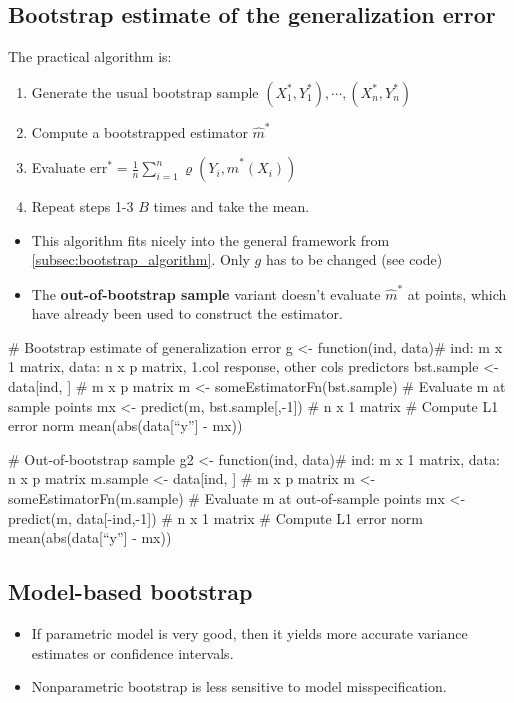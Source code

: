  \subsection{Bootstrap estimate of the generalization error}
 \begin{theory}
  The practical algorithm is:
  \begin{enumerate}
   \item Generate the usual bootstrap sample $(X_1^{\ast}, Y_1^{\ast}), \cdots, (X_n^{\ast}, Y_n^{\ast})$
   \item Compute a bootstrapped estimator $\hat{m}^{\ast}$
   \item Evaluate $\text{err}^{\ast} = \frac{1}{n} \sum_{i=1}^n \varrho(Y_i, \hat{m}^{\ast}(X_i))$
   \item Repeat steps 1-3 $B$ times and take the mean.
  \end{enumerate}
  \begin{itemize}
   \item This algorithm fits nicely into the general framework from \ref{subsec:bootstrap_algorithm}. Only $g$ has to be changed (see code)
   \item The \textbf{out-of-bootstrap sample} variant doesn't evaluate $\hat{m}^{\ast}$ at points, which have already been used to construct the estimator.
  \end{itemize}
 \end{theory}

 \begin{code}
  # Bootstrap estimate of generalization error
  g <- function(ind, data){# ind: m x 1 matrix, data: n x p matrix, 1.col response, other cols predictors
    bst.sample <- data[ind, ] # m x p matrix
    m <- someEstimatorFn(bst.sample)
    # Evaluate m at sample points
    mx <- predict(m, bst.sample[,-1]) # n x 1 matrix
    # Compute L1 error norm
    mean(abs(data[``y''] - mx))
  }
  
  # Out-of-bootstrap sample
  g2 <- function(ind, data){# ind: m x 1 matrix, data: n x p matrix
    m.sample <- data[ind, ] # m x p matrix
    m <- someEstimatorFn(m.sample)
    # Evaluate m at out-of-sample points
    mx <- predict(m, data[-ind,-1]) # n x 1 matrix
    # Compute L1 error norm
    mean(abs(data[``y''] - mx))
  }
 \end{code}

 \subsection{Model-based bootstrap}
 \begin{application}
 \begin{itemize}
  \item[\leftthumbsup] If parametric model is very good, then it yields more accurate variance estimates or confidence intervals.
  \item[\leftthumbsdown] Nonparametric bootstrap is less sensitive to model misspecification.
 \end{itemize}
 \end{application}
 
